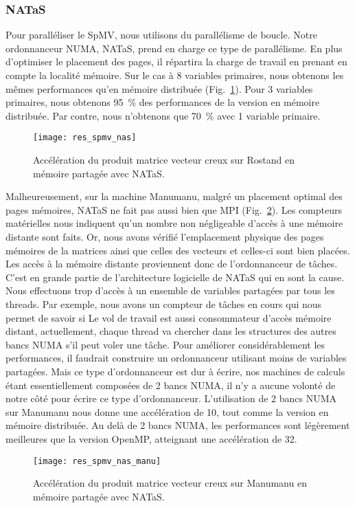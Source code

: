 \subsubsection{NATaS}
Pour paralléliser le SpMV, nous utilisons du parallélisme de boucle.
%
Notre ordonnanceur NUMA, NATaS, prend en charge ce type de parallélisme.
%
En plus d'optimiser le placement des pages, il répartira la charge de travail en prenant en compte la localité mémoire.
%
Sur le cas à 8 variables primaires, nous obtenons les mêmes performances qu'en mémoire distribuée (Fig.~\ref{fig:res_spmv_nas}).
%
Pour 3 variables primaires, nous obtenons 95~\% des performances de la version en mémoire distribuée.
%
Par contre, nous n'obtenons que 70~\% avec 1 variable primaire.

\begin{figure}
  \centering
  \texttt{[image: res\_spmv\_nas]}
  \caption{Accélération du produit matrice vecteur creux sur Rostand en mémoire partagée avec NATaS.}
  \label{fig:res_spmv_nas}
\end{figure}


Malheureusement, sur la machine Manumanu, malgré un placement optimal des pages mémoires, NATaS ne fait pas aussi bien que MPI (Fig.~\ref{fig:res_spmv_nas_manumanu}).
%
Les compteurs matérielles nous indiquent qu'un nombre non négligeable d'accès à une mémoire distante sont faits.
%
Or, nous avons vérifié l'emplacement physique des pages mémoires de la matrices ainsi que celles des vecteurs et celles-ci sont bien placées.
%
Les accès à la mémoire distante proviennent donc de l'ordonnanceur de tâches.
%
C'est en grande partie de l'architecture logicielle de NATaS qui en sont la cause.
%
Nous effectuons trop d'accès à un ensemble de variables partagées par tous les threads.
%
Par exemple, nous avons un compteur de tâches en cours qui nous permet de savoir si
%
Le vol de travail est aussi consommateur d'accès mémoire distant, actuellement, chaque thread va chercher dans les structures des autres bancs NUMA s'il peut voler une tâche.
%
Pour améliorer considérablement les performances, il faudrait construire un ordonnanceur utilisant moins de variables partagées.
%
Mais ce type d'ordonnanceur est dur à écrire, nos machines de calculs étant essentiellement composées de 2 bancs NUMA, il n'y a aucune volonté de notre côté pour écrire ce type d'ordonnanceur.
%
L'utilisation de 2 bancs NUMA sur Manumanu nous donne une accélération de 10, tout comme la version en mémoire distribuée.
%
Au delà de 2 bancs NUMA, les performances sont légèrement meilleures que la version OpenMP, atteignant une accélération de 32.

\begin{figure}
  \centering
  \texttt{[image: res\_spmv\_nas\_manu]}
  \caption{Accélération du produit matrice vecteur creux sur Manumanu en mémoire partagée avec NATaS.}
  \label{fig:res_spmv_nas_manumanu}
\end{figure}
